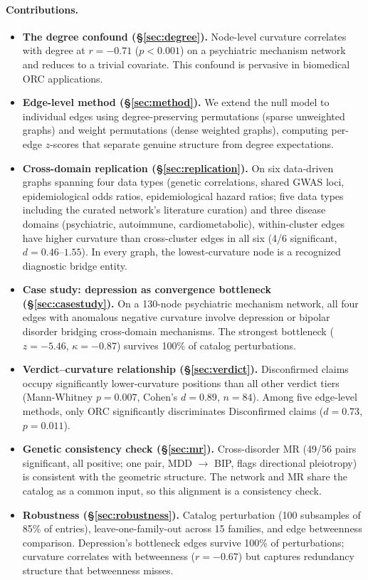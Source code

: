 \documentclass[11pt]{article}
\begin{document}
\paragraph{Contributions.}
\begin{itemize}
\item \textbf{The degree confound (\S\ref{sec:degree}).} Node-level curvature correlates with degree at $r = -0.71$ ($p < 0.001$) on a psychiatric mechanism network and reduces to a trivial covariate. This confound is pervasive in biomedical ORC applications.
\item \textbf{Edge-level method (\S\ref{sec:method}).} We extend the null model to individual edges using degree-preserving permutations (sparse unweighted graphs) and weight permutations (dense weighted graphs), computing per-edge $z$-scores that separate genuine structure from degree expectations.
\item \textbf{Cross-domain replication (\S\ref{sec:replication}).} On six data-driven graphs spanning four data types (genetic correlations, shared GWAS loci, epidemiological odds ratios, epidemiological hazard ratios; five data types including the curated network's literature curation) and three disease domains (psychiatric, autoimmune, cardiometabolic), within-cluster edges have higher curvature than cross-cluster edges in all six (4/6 significant, $d = 0.46$--$1.55$). In every graph, the lowest-curvature node is a recognized diagnostic bridge entity.
\item \textbf{Case study: depression as convergence bottleneck (\S\ref{sec:casestudy}).} On a 130-node psychiatric mechanism network, all four edges with anomalous negative curvature involve depression or bipolar disorder bridging cross-domain mechanisms. The strongest bottleneck ($z = -5.46$, $\kappa = -0.87$) survives 100\% of catalog perturbations.
\item \textbf{Verdict--curvature relationship (\S\ref{sec:verdict}).} Disconfirmed claims occupy significantly lower-curvature positions than all other verdict tiers (Mann-Whitney $p = 0.007$, Cohen's $d = 0.89$, $n = 84$). Among five edge-level methods, only ORC significantly discriminates Disconfirmed claims ($d = 0.73$, $p = 0.011$).
\item \textbf{Genetic consistency check (\S\ref{sec:mr}).} Cross-disorder MR (49/56 pairs significant, all positive; one pair, MDD $\to$ BIP, flags directional pleiotropy) is consistent with the geometric structure. The network and MR share the catalog as a common input, so this alignment is a consistency check.
\item \textbf{Robustness (\S\ref{sec:robustness}).} Catalog perturbation (100 subsamples of 85\% of entries), leave-one-family-out across 15 families, and edge betweenness comparison. Depression's bottleneck edges survive 100\% of perturbations; curvature correlates with betweenness ($r = -0.67$) but captures redundancy structure that betweenness misses.
\end{itemize}
\end{document}
